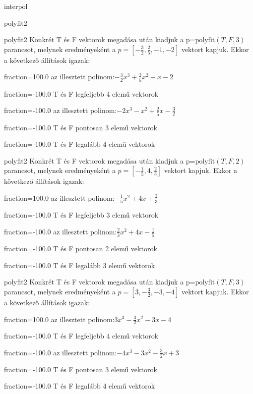 \documentclass[12pt]{article}
\begin{document}
\begin{quiz}{interpol}
\begin{multi}[multiple]{polyfit2}
\end{multi}
\begin{multi}[multiple]{polyfit2}
Konkrét T és F vektorok megadása után kiadjuk a p=$\mathrm{polyfit}(T,F,3)$
parancsot, melynek eredményeként a $p=\left[-\frac{3}{2},\frac{2}{5},-1,-2\right]$ vektort kapjuk.
Ekkor a következő állítások igazak:
\item[fraction=100.0] az illesztett polinom:$-\frac{3}{2}x^3+\frac{2}{5}x^2-x-2$
\item[fraction=-100.0]  T és F legfeljebb 4 elemű vektorok
\item[fraction=-100.0]  az illesztett polinom:$-2x^3-x^2+\frac{2}{5}x-\frac{3}{2}$
\item[fraction=-100.0]  T és F pontosan 3 elemű vektorok
\item[fraction=-100.0] T és F legalább 4 elemű vektorok
\end{multi}
\begin{multi}[multiple]{polyfit2}
Konkrét T és F vektorok megadása után kiadjuk a p=$\mathrm{polyfit}(T,F,2)$
parancsot, melynek eredményeként a $p=\left[-\frac{1}{5},4,\frac{2}{3}\right]$ vektort kapjuk.
Ekkor a következő állítások igazak:
\item[fraction=100.0] az illesztett polinom:$-\frac{1}{5}x^2+4x+\frac{2}{3}$
\item[fraction=-100.0]  T és F legfeljebb 3 elemű vektorok
\item[fraction=-100.0]  az illesztett polinom:$\frac{2}{3}x^2+4x-\frac{1}{5}$
\item[fraction=-100.0]  T és F pontosan 2 elemű vektorok
\item[fraction=-100.0] T és F legalább 3 elemű vektorok
\end{multi}
\begin{multi}[multiple]{polyfit2}
Konkrét T és F vektorok megadása után kiadjuk a p=$\mathrm{polyfit}(T,F,3)$
parancsot, melynek eredményeként a $p=\left[3,-\frac{3}{2},-3,-4\right]$ vektort kapjuk.
Ekkor a következő állítások igazak:
\item[fraction=100.0] az illesztett polinom:$3x^3-\frac{3}{2}x^2-3x-4$
\item[fraction=-100.0]  T és F legfeljebb 4 elemű vektorok
\item[fraction=-100.0]  az illesztett polinom:$-4x^3-3x^2-\frac{3}{2}x+3$
\item[fraction=-100.0]  T és F pontosan 3 elemű vektorok
\item[fraction=-100.0] T és F legalább 4 elemű vektorok
\end{multi}

\end{quiz}
\end{document}
